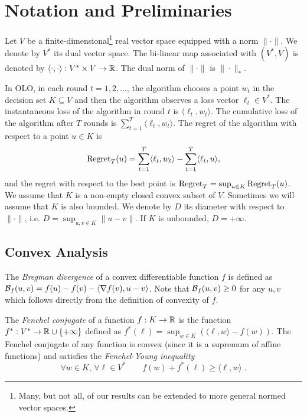 \section{Notation and Preliminaries}
\label{section:preliminaries}

Let $V$ be a finite-dimensional\footnote{Many, but not all, of our
results can be extended to more general normed vector spaces.} real vector
space equipped with a norm $\|\cdot\|$. We denote by $V^*$ its dual vector
space.  The bi-linear map associated with $(V^*, V)$ is denoted by $\langle
\cdot, \cdot \rangle:V^* \times V \to \mathbb{R}$.  The dual norm of $\|\cdot\|$ is
$\|\cdot\|_*$.

In OLO, in each round $t=1,2,\dots$, the algorithm chooses a point $w_t$ in the
decision set $K \subseteq V$ and then the algorithm observes a loss vector
$\ell_t \in V^*$. The instantaneous loss of the algorithm in round $t$ is
$\langle \ell_t, w_t \rangle$. The cumulative loss of the algorithm after $T$
rounds is $\sum_{t=1}^T \langle \ell_t, w_t \rangle$.  The regret of the
algorithm with respect to a point $u \in K$ is
$$
\operatorname{Regret}_T(u) = \sum_{t=1}^T \langle \ell_t, w_t \rangle - \sum_{t=1}^T \langle \ell_t, u \rangle,
$$
and the regret with respect to the best point is $\operatorname{Regret}_T= \sup_{u \in K}
\operatorname{Regret}_T(u)$.  We assume that $K$ is a non-empty closed convex subset of $V$.
Sometimes we will assume that $K$ is also bounded. We denote by $D$ its
diameter with respect to $\|\cdot\|$, i.e. $D = \sup_{u,v \in K} \|u - v\|$. If
$K$ is unbounded, $D = +\infty$.

\subsection{Convex Analysis}

The \emph{Bregman divergence} of a convex differentiable function $f$ is
defined as $\mathcal{B}_f(u,v) = f(u) - f(v) - \langle \nabla f(v), u - v \rangle$.
Note that $\mathcal{B}_f(u,v) \ge 0$ for any $u,v$ which follows directly from the
definition of convexity of $f$.

The \emph{Fenchel conjugate} of a function $f:K \to \mathbb{R}$ is the function
$f^*:V^* \to \mathbb{R} \cup \{+\infty\}$ defined as $f^*(\ell) = \sup_{w \in K} \left(
\langle \ell, w \rangle - f(w) \right)$.  The Fenchel conjugate of any function
is convex (since it is a supremum of affine functions) and satisfies
 the \emph{Fenchel-Young inequality}
$$
\text{$\forall w \in K$, $\forall \ell \in V^*$} \qquad
f(w) + f^*(\ell) \ge \langle \ell, w \rangle \; .
$$


